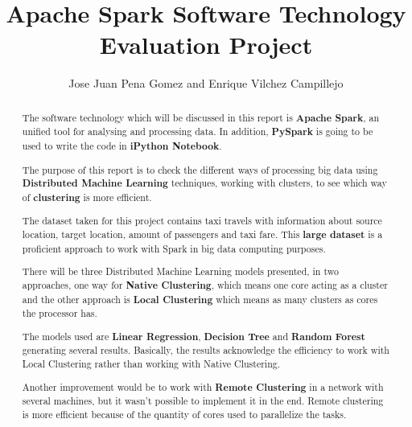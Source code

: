 \documentclass[11pt]{article}
\begin{document}
\title{Apache Spark Software Technology Evaluation Project}

\author{Jose Juan Pena Gomez and Enrique Vilchez Campillejo}

\maketitle

\begin{abstract}

The software technology which will be discussed in this report is \textbf{Apache Spark}, an unified tool for analysing and processing data. In addition, \textbf{PySpark} is going to be used to write the code in \textbf{iPython Notebook}.

The purpose of this report is to check the different ways of processing big data using \textbf{Distributed Machine Learning} techniques, working with clusters, to see which way of \textbf{clustering} is more efficient.

The dataset taken for this project contains taxi travels with information about source location, target location, amount of passengers and taxi fare. This \textbf{large dataset} is a proficient approach to work with Spark in big data computing purposes.

There will be three Distributed Machine Learning models presented, in two approaches, one way for \textbf{Native Clustering}, which means one core acting as a cluster and the other approach is \textbf{Local Clustering} which means as many clusters as cores the processor has.

The models used are \textbf{Linear Regression}, \textbf{Decision Tree} and \textbf{Random Forest} generating several results. Basically, the results acknowledge the efficiency to work with Local Clustering rather than working with Native Clustering. 

Another improvement would be to work with \textbf{Remote Clustering} in a network with several machines, but it wasn't possible to implement it in the end. Remote clustering is more efficient because of the quantity of cores used to parallelize the tasks.

  
\end{abstract}

%












{}
\end{document}
